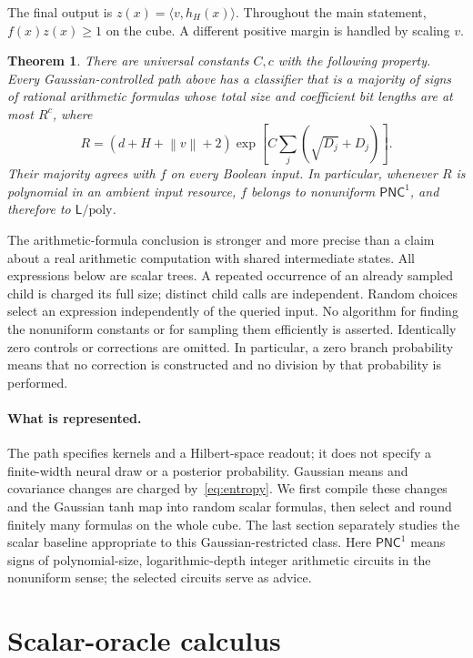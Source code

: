 \documentclass[11pt]{article}
\newtheorem{theorem}{Theorem}[section]
\theoremstyle{remark}\newtheorem{remark}[theorem]{Remark}
\newcommand{\PNC}{\mathsf{PNC}}
\newcommand{\Lpoly}{\mathsf L/\mathrm{poly}}
\newcommand{\norm}[1]{\left\lVert #1\right\rVert}
\begin{document}
The final output is $z(x)=\langle v,h_H(x)\rangle$. Throughout the main
statement, $f(x)z(x)\ge1$ on the cube. A different positive margin is
handled by scaling $v$.

\begin{theorem}\label{thm:main}
There are universal constants $C,c$ with the following property. Every
Gaussian-controlled path above has a classifier that is a majority of
signs of rational arithmetic formulas whose total size and coefficient
bit lengths are at most $R^c$, where
\[
 R=(d+H+\norm v+2)\exp\!\left[C\sum_j(\sqrt{D_j}+D_j)\right].
\]
Their majority agrees with $f$ on every Boolean input. In particular, whenever
$R$ is polynomial in an ambient input resource, $f$ belongs to nonuniform
$\PNC^1$, and therefore to $\Lpoly$.
\end{theorem}

The arithmetic-formula conclusion is stronger and more precise than a
claim about a real arithmetic computation with shared intermediate states.
All expressions below are scalar trees. A repeated occurrence of an
already sampled child is charged its full size; distinct child calls are
independent. Random choices select an expression independently of the
queried input. No algorithm for finding the nonuniform constants or for
sampling them efficiently is asserted.
Identically zero controls or corrections are omitted. In particular,
a zero branch probability means that no correction is constructed and
no division by that probability is performed.

\paragraph{What is represented.}
The path specifies kernels and a Hilbert-space readout; it does not specify
a finite-width neural draw or a posterior probability. Gaussian means and
covariance changes are charged by~\eqref{eq:entropy}. We first compile
these changes and the Gaussian tanh map into random scalar formulas,
then select and round finitely many formulas on the whole cube. The last
section separately studies the scalar baseline appropriate to this
Gaussian-restricted class. Here $\mathsf{PNC}^1$ means signs of
polynomial-size, logarithmic-depth integer arithmetic circuits in the
nonuniform sense; the selected circuits serve as advice.

\section{Scalar-oracle calculus}
\end{document}
